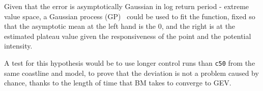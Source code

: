 Given that
the error is asymptotically Gaussian in log return period - extreme value space,
a Gaussian process (GP)~\cite{williams2006gaussian, duvenaud2014automatic}
could be used to fit the function, fixed so that
the asymptotic mean at the left hand is the 0, and the right is at the
estimated plateau value given the responsiveness of the point and the potential intensity.

A test for this hypothesis would be to use longer control runs than \texttt{c50}
from the same coastline and model, to prove that the deviation is not a problem caused
by chance, thanks to the length of time that BM takes to converge to GEV.






\FloatBarrier
